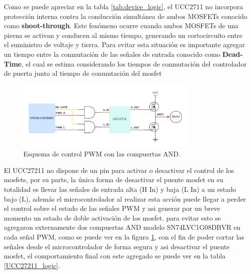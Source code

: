 \documentclass[11pt]{report}
\begin{document}
\newpage
Como se puede apreciar en la tabla \ref{tab:device_logic}, el UCC2711 no incorpora protección interna contra la conducción simultánea de ambos MOSFETs conocido como \textbf{shoot-through}. Este fenómeno ocurre cuando ambos MOSFETs de una pierna se activan y conducen al mismo tiempo, generando un cortocircuito entre el suministro de voltaje y tierra. Para evitar esta situación es importante agregar un tiempo entre la conmutación de las señales de entrada conocido como \textbf{Dead-Time}, el cual se estima considerando los tiempos de conmutación del controlador de puerta junto al tiempo de conmutación del mosfet

\begin{figure}[ht]
	\centering
	\includegraphics[width=0.8\textwidth]{imagenes/Diagramas/Diagramas - AND.png}
	\caption{Esquema de control PWM con las compuertas AND.}
	\label{fig:control-pwm-and}
\end{figure}
\FloatBarrier

El UCC27211 no dispone de un pin para activar o desactivar el control de los mosfets, por su parte, la única forma de desactivar el puente mosfet en su totalidad es llevar las señales de entrada alta (H In) y baja (L In) a un estado bajo (L), además el microcontrolador al realizar esta acción puede llegar a perder el control sobre el estado de las señales PWM y asi generar por un breve momento un estado de doble activación de los mosfet. para evitar esto se agregaron externamente dos compuertas AND modelo SN74LVC1G08DBVR en cada señal PWM, como se puede ver en la figura \ref{fig:control-pwm-and}, con el fin de poder cortar las señales desde el microcontrolador de forma segura y asi desactivar el puente mosfet, el comportamiento final con este agregado se puede ver en la tabla \ref{UCC27211_logic}.
\end{document}
